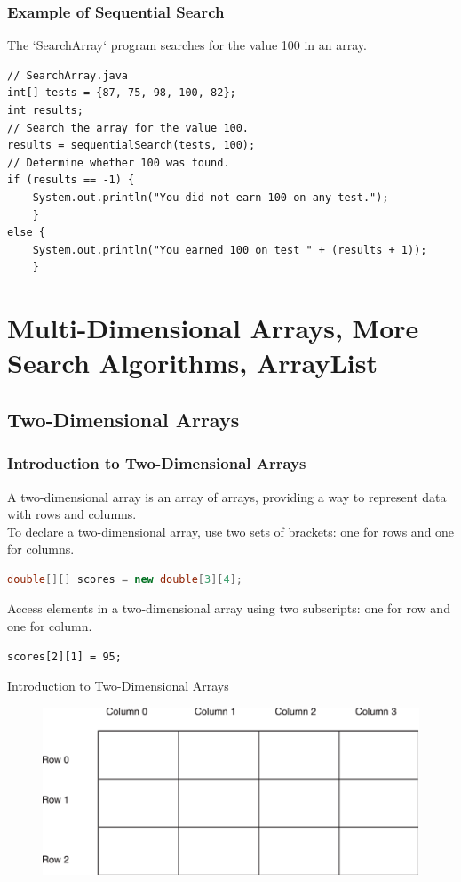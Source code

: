\documentclass[11pt]{beamer}
\begin{document}
\begin{frame}[fragile]
    \frametitle{Example of Sequential Search}
    The `SearchArray` program searches for the value 100 in an array.
    \begin{lstlisting}[basicstyle=\ttfamily\footnotesize]
// SearchArray.java
int[] tests = {87, 75, 98, 100, 82};
int results;
// Search the array for the value 100.
results = sequentialSearch(tests, 100);
// Determine whether 100 was found.
if (results == -1) {
    System.out.println("You did not earn 100 on any test.");
    } 
else {
    System.out.println("You earned 100 on test " + (results + 1));
    }
    \end{lstlisting}
\end{frame}

\section{Multi-Dimensional Arrays, More Search Algorithms, ArrayList}
\subsection{Two-Dimensional Arrays}
\begin{frame}[fragile]
\frametitle{Introduction to Two-Dimensional Arrays}
    A two-dimensional array is an array of arrays, providing a way to represent data with rows and columns. \\ \vspace{1em}
    To declare a two-dimensional array, use two sets of brackets: one for rows and one for columns.
    \begin{lstlisting}[language=Java]
double[][] scores = new double[3][4];
    \end{lstlisting}
    Access elements in a two-dimensional array using two subscripts: one for row and one for column.
    \begin{lstlisting}
scores[2][1] = 95;
    \end{lstlisting}
\end{frame}

\begin{frame}{Introduction to Two-Dimensional Arrays}
    \noindent 
    \begin{figure}[H]
    \centering
    \includegraphics[scale=0.6]{Images/chapter07_section09_fig18.png}
    \end{figure}   
\end{frame}
\end{document}
